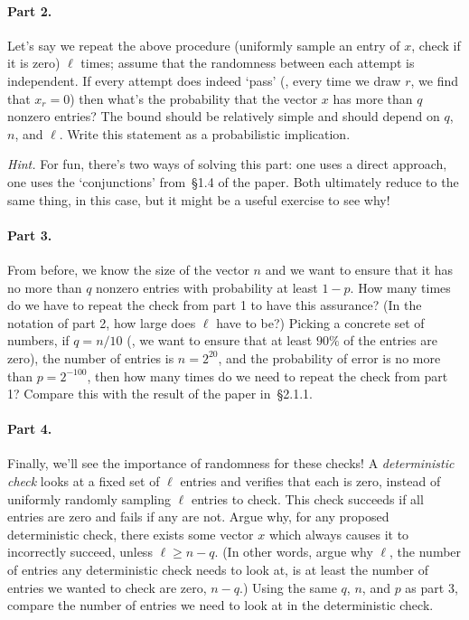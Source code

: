 \documentclass[12pt]{article}
\begin{document}
\paragraph{Part 2.} Let's say we repeat the above procedure (uniformly sample
an entry of $x$, check if it is zero) $\ell$ times; assume that the randomness
between each attempt is independent. If every attempt does indeed `pass' (\ie,
every time we draw $r$, we find that $x_r = 0$) then what's the probability
that the vector $x$ has more than $q$ nonzero entries? The bound should be
relatively simple and should depend on $q$, $n$, and $\ell$. Write this
statement as a probabilistic implication.

\emph{Hint.} For fun, there's two ways of solving this part: one uses a direct
approach, one uses the `conjunctions' from~\S1.4 of the paper. Both ultimately
reduce to the same thing, in this case, but it might be a useful exercise to
see why!

\paragraph{Part 3.} From before, we know the size of the vector $n$ and we want
to ensure that it has no more than $q$ nonzero entries with probability at
least $1-p$. How many times do we have to repeat the check from part 1 to have
this assurance? (In the notation of part 2, how large does $\ell$ have to be?)
Picking a concrete set of numbers, if $q = n/10$ (\ie, we want to ensure that
at least $90\%$ of the entries are zero), the number of entries is $n=2^{20}$,
and the probability of error is no more than $p=2^{-100}$, then how many times
do we need to repeat the check from part 1? Compare this with the result of the
paper in~\S2.1.1.

\paragraph{Part 4.} Finally, we'll see the importance of randomness for these
checks! A \emph{deterministic check} looks at a fixed set of $\ell$ entries and
verifies that each is zero, instead of uniformly randomly sampling $\ell$
entries to check. This check succeeds if all entries are zero and fails if any
are not. Argue why, for any proposed deterministic check, there exists some
vector $x$ which always causes it to incorrectly succeed, unless $\ell \ge
n-q$. (In other words, argue why $\ell$, the number of entries any
deterministic check needs to look at, is at least the number of entries we
wanted to check are zero, $n-q$.) Using the same $q$, $n$, and $p$ as part 3,
compare the number of entries we need to look at in the deterministic check.
\end{document}
